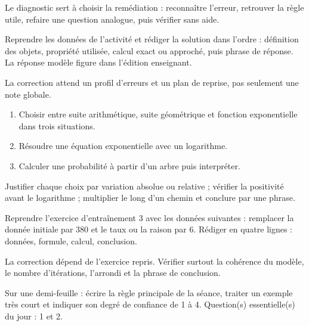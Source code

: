 \begin{summary}Le diagnostic sert à choisir la remédiation : reconnaître l'erreur, retrouver la règle utile, refaire une question analogue, puis vérifier sans aide.\end{summary}

\begin{example}
Reprendre les données de l'activité et rédiger la solution dans l'ordre : définition des objets, propriété utilisée, calcul exact ou approché, puis phrase de réponse. La réponse modèle figure dans l'édition enseignant.
\end{example}
\begin{solution}La correction attend un profil d'erreurs et un plan de reprise, pas seulement une note globale.\end{solution}

\begin{exercise}[essentiel]
\begin{enumerate}\item Choisir entre suite arithmétique, suite géométrique et fonction exponentielle dans trois situations.\item Résoudre une équation exponentielle avec un logarithme.\item Calculer une probabilité à partir d'un arbre puis interpréter.\end{enumerate}
\end{exercise}
\begin{solution}Justifier chaque choix par variation absolue ou relative ; vérifier la positivité avant le logarithme ; multiplier le long d'un chemin et conclure par une phrase.\end{solution}


\begin{homework}Reprendre l'exercice d'entraînement 3 avec les données suivantes : remplacer la donnée initiale par $380$ et le taux ou la raison par $6$. Rédiger en quatre lignes : données, formule, calcul, conclusion.\end{homework}
\begin{solution}La correction dépend de l'exercice repris. Vérifier surtout la cohérence du modèle, le nombre d'itérations, l'arrondi et la phrase de conclusion.\end{solution}

\begin{exitticket}[3 minutes]Sur une demi-feuille : écrire la règle principale de la séance, traiter un exemple très court et indiquer son degré de confiance de 1 à 4. Question(s) essentielle(s) du jour : 1 et 2.\end{exitticket}

